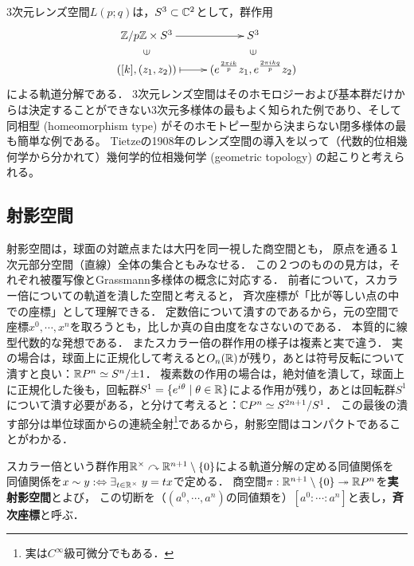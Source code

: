 \documentclass[uplatex,dvipdfmx]{jsreport}
\begin{document}
\begin{remark}
    3次元レンズ空間$L(p;q)$は，$S^3\subset\mathbb{C}^2$として，群作用
    \[\xymatrix@R-2pc{
        \Z/p\Z\times S^3\ar[r]&S^3\\
        \rotatebox[origin=c]{90}{$\in$}&\rotatebox[origin=c]{90}{$\in$}\\
        ([k],(z_1,z_2))\ar@{|->}[r]&(e^{\frac{2\pi ik}{p}}z_1,e^{\frac{2\pi ikq}{p}}z_2)
    }\]
    による軌道分解である．
    3次元レンズ空間はそのホモロジーおよび基本群だけからは決定することができない3次元多様体の最もよく知られた例であり、そして同相型 (homeomorphism type) がそのホモトピー型から決まらない閉多様体の最も簡単な例である。
    Tietzeの1908年のレンズ空間の導入を以って（代数的位相幾何学から分かれて）幾何学的位相幾何学 (geometric topology) の起こりと考えられる。
\end{remark}

\subsection{射影空間}

\begin{tcolorbox}[colframe=ForestGreen, colback=ForestGreen!10!white,breakable,colbacktitle=ForestGreen!40!white,coltitle=black,fonttitle=\bfseries\sffamily,
title=]
    射影空間は，球面の対蹠点または大円を同一視した商空間とも，
    原点を通る１次元部分空間（直線）全体の集合ともみなせる．
    この２つのものの見方は，それぞれ被覆写像とGrassmann多様体の概念に対応する．
    前者について，スカラー倍についての軌道を潰した空間と考えると，
    斉次座標が「比が等しい点の中での座標」として理解できる．
    定数倍について潰すのであるから，元の空間で座標$x^0,\cdots,x^n$を取ろうとも，比しか真の自由度をなさないのである．
    本質的に線型代数的な発想である．
    またスカラー倍の群作用の様子は複素と実で違う．
    実の場合は，球面上に正規化して考えると$O_n(\mathbb{R})$が残り，あとは符号反転について潰すと良い：$\mathbb{R} P^n\simeq S^n/{\pm 1}$．
    複素数の作用の場合は，絶対値を潰して，球面上に正規化した後も，回転群$S^1=\{e^{i\theta}\mid\theta\in\mathbb{R}\}$による作用が残り，あとは回転群$S^1$について潰す必要がある，と分けて考えると：$\mathbb{C} P^n\simeq S^{2n+1}/S^1$．
    この最後の潰す部分は単位球面からの連続全射\footnote{実は$C^\infty$級可微分でもある．}であるから，射影空間はコンパクトであることがわかる．
\end{tcolorbox}

\begin{definition}
    スカラー倍という群作用$\mathbb{R}^\times\curvearrowright\mathbb{R}^{n+1}\setminus\{0\}$による軌道分解の定める同値関係を
    同値関係を$x\sim y:\Leftrightarrow\exists_{t\in\mathbb{R}^\times}\;y=tx$で定める．
    商空間$\pi:\mathbb{R}^{n+1}\setminus\{0\}\twoheadrightarrow\mathbb{R} P^n$を\textbf{実射影空間}とよび，
    この切断を（$(a^0,\cdots,a^n)$の同値類を）$[a^0:\cdots:a^n]$と表し，\textbf{斉次座標}と呼ぶ．
\end{definition}
\end{document}
